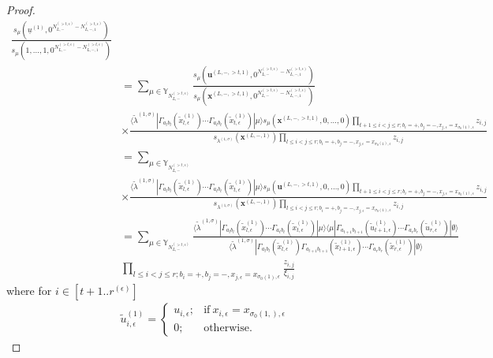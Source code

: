 \documentclass[11pt]{amsart}
\theoremstyle{plain}
\theoremstyle{definition}
\theoremstyle{remark}
\newcommand\si{\sigma}
\newcommand\YY{\mathbb{Y}}
\numberwithin{equation}{section}
\numberwithin{theorem}{section}
\numberwithin{figure}{section}
\begin{document}
\begin{proof}
\begin{align*}
\frac{s_{\mu}(\underline{u}^{(1)},0^{N_{L,-}^{(>t,\epsilon)}-N_{L,-,1}^{(>t,\epsilon)}})}{s_{\mu}(1,\ldots,1,0^{N_{L,-}^{(>t,\epsilon)}-N_{L,-,1}^{(>t,\epsilon)}})}\\
&=\sum_{\mu\in \YY_{N_{L,-}^{(>t,\epsilon)}}}
\frac{s_{\mu}(\mathbf{u}^{(L,-,>t,1)},0^{N_{L,-}^{(>t,\epsilon)}-N_{L,-,1}^{(>t,\epsilon)}})}{s_{\mu}(\mathbf{x}^{(L,-,>t,1)},0^{N_{L,-}^{(>t,\epsilon)}-N_{L,-,1}^{(>t,\epsilon)}})}
\\
&\times\frac{\langle\tilde{\lambda}^{(1,\sigma)}| \Gamma_{a_lb_l}(\tilde{x}_{l,\epsilon}^{(1)})\cdots \Gamma_{a_{t}b_{t}}(\tilde{x}_{t,\epsilon}^{(1)})|\mu \rangle
s_{\mu}\left(\mathbf{x}^{(L,-,>t,1)},0,\ldots,0\right)\prod_{t+1\leq i<j\leq r;b_i=+,b_j=-,x_{j,\epsilon}=x_{\sigma_0(1),\epsilon}}z_{i,j}}{s_{\lambda^{(1,\si)}}\left(\mathbf{x}^{(L,-,1)}\right)\prod_{l\leq i<j\leq r;b_i=+,b_j=-,x_{j,\epsilon}=x_{\sigma_0(1),\epsilon}}z_{i,j}}\\ 
&=\sum_{\mu\in \YY_{N_{L,-}^{(>t,\epsilon)}}}
\\
&\times\frac{\langle\tilde{\lambda}^{(1,\sigma)}| \Gamma_{a_lb_l}(\tilde{x}_{l,\epsilon}^{(1)})\cdots \Gamma_{a_{t}b_{t}}(\tilde{x}_{t,\epsilon}^{(1)})|\mu \rangle
s_{\mu}\left(\mathbf{u}^{(L,-,>t,1)},0,\ldots,0\right)\prod_{t+1\leq i<j\leq r;b_i=+,b_j=-,x_{j,\epsilon}=x_{\sigma_0(1),\epsilon}}z_{i,j}}{s_{\lambda^{(1,\si)}}\left(\mathbf{x}^{(L,-,1)}\right)\prod_{l\leq i<j\leq r;b_i=+,b_j=-,x_{j,\epsilon}=x_{\sigma_0(1),\epsilon}}z_{i,j}}\\
&=\sum_{\mu\in \YY_{N_{L,-}^{(>t,\epsilon)}}}\frac{\langle\tilde{\lambda}^{(1,\sigma)}| \Gamma_{a_lb_l}(\tilde{x}_{l,\epsilon}^{(1)})\cdots \Gamma_{a_{t}b_{t}}(\tilde{x}_{t,\epsilon}^{(1)})|\mu \rangle
\langle\mu| \Gamma_{a_{t+1}b_{t+1}}(\tilde{u}_{t+1,\epsilon}^{(1)})\cdots \Gamma_{a_{r}b_{r}}(\tilde{u}_{r,\epsilon}^{(1)})|\emptyset \rangle}{\langle\tilde{\lambda}^{(1,\sigma)}| \Gamma_{a_lb_l}(\tilde{x}_{l,\epsilon}^{(1)})\Gamma_{a_{l+1}b_{l+1}}(\tilde{x}_{l+1,\epsilon}^{(1)})\cdots \Gamma_{a_rb_r}(\tilde{x}_{r,\epsilon}^{(1)})|\emptyset \rangle}\\
&\prod_{l\leq i<j\leq r;b_i=+,b_j=-,x_{j,\epsilon}=x_{\sigma_0(1),\epsilon}}\frac{z_{i,j}}{\xi_{i,j}}
\end{align*}
where for $i\in[t+1..r^{(\epsilon)}]$
\begin{align*}
\tilde{u}_{i,\epsilon}^{(1)}=\begin{cases}u_{i,\epsilon};&\mathrm{if}\ x_{i,\epsilon}=x_{\si_0(1,),\epsilon}\\0;&\mathrm{otherwise}.\end{cases}
\end{align*}


\end{proof}
\end{document}
